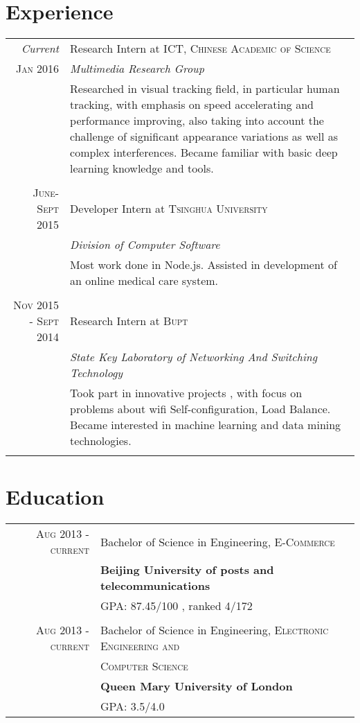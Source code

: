 \documentclass[a4paper,10pt]{article}
\begin{document}
\section{Experience}
\begin{tabular}{r|p{11cm}}
 \emph{Current} & Research Intern at \textsc{ICT, Chinese Academic of Science} \\\textsc{Jan 2016}&\emph{Multimedia Research Group}\\&\footnotesize{Researched in visual tracking field, in particular human tracking, with emphasis on speed accelerating and performance improving, also taking into account the challenge of significant appearance variations as well as complex interferences. Became familiar with basic deep learning knowledge and tools.}\\\multicolumn{2}{c}{} \\
 \textsc{June-Sept 2015} & Developer Intern at \textsc{Tsinghua University}  \\&\emph{Division of Computer Software}\\&\footnotesize{Most work done in Node.js. Assisted in development of an online medical care system.}\\\multicolumn{2}{c}{} \\
 \textsc{Nov 2015 - Sept 2014} & Research Intern at \textsc{Bupt}  \\&\emph{State Key Laboratory of Networking And Switching Technology}\\&\footnotesize{Took part in innovative projects , with focus on problems about wifi Self-configuration, Load Balance. Became interested in machine learning and data mining technologies.}\\\multicolumn{2}{c}{} \\
\end{tabular}

\section{Education}
\begin{tabular}{rl}	
 \textsc{Aug 2013} - \textsc{current} & Bachelor of Science in Engineering, \textsc{E-Commerce}\\
& \textbf{Beijing University of posts and telecommunications}\\
& \textsc{GPA: 87.45/100}  , ranked \textsc{4/172}\\
\\

 \textsc{Aug 2013} - \textsc{current} & Bachelor of Science in Engineering, \textsc{Electronic Engineering and}\\
&  \textsc{Computer Science}\\
& \textbf{Queen Mary University of London}\\
& \textsc{GPA: 3.5/4.0}  \\
\end{tabular}
\end{document}
